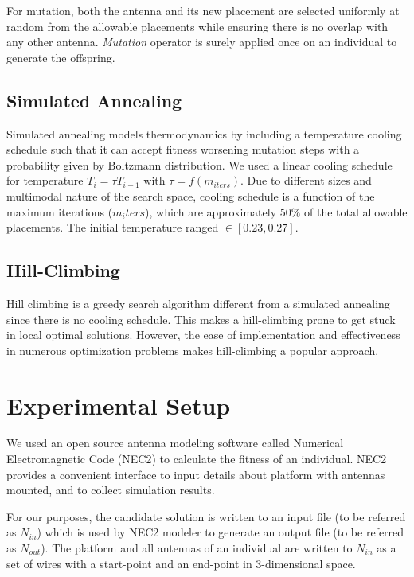 \documentclass[conference]{IEEEtran}
\begin{document}
For mutation, both the antenna and its new placement are selected uniformly at random from the allowable placements while ensuring there is no overlap with any other antenna. \textit{Mutation} operator is surely applied once on an individual to generate the offspring.
\subsection{Simulated Annealing}
\label{sec:algoriths-sa}
Simulated annealing models thermodynamics by including a temperature cooling schedule such that it can accept fitness worsening mutation steps with a probability given by Boltzmann distribution. We used a linear cooling schedule for temperature $T_i = \tau T_{i-1}$ with $\tau = f(m_{iters})$. Due to different sizes and multimodal nature of the search space, cooling schedule is a function of the maximum iterations ($m_iters$), which are approximately $50\%$ of the total allowable placements. The initial temperature ranged $\in [0.23, 0.27]$.
\subsection{Hill-Climbing}
\label{sec:algoriths-hc}
Hill climbing is a greedy search algorithm different from a simulated annealing since there is no cooling schedule. This makes a hill-climbing prone to get stuck in local optimal solutions. However, the ease of implementation and effectiveness in numerous optimization problems \cite{skalak1994} makes hill-climbing a popular approach.

\section{Experimental Setup}
\label{sec:setup}
We used an open source antenna modeling software called Numerical Electromagnetic Code (NEC2) to calculate the fitness of an individual. NEC2 provides a convenient interface to input details about platform with antennas mounted, and to collect simulation results.

For our purposes, the candidate solution is written to an input file (to be referred as $N_{in}$) which is used by NEC2 modeler to generate an output file (to be referred as $N_{out}$). The platform and all antennas of an individual are written to $N_{in}$ as a set of wires with a start-point and an end-point in 3-dimensional space.  
\end{document}
